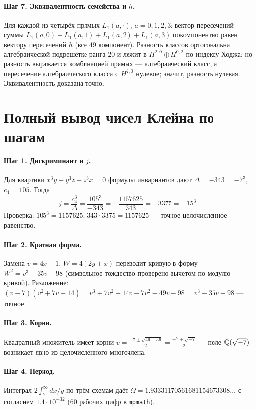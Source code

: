 \paragraph{Шаг 7. Эквивалентность семейства и $h$.} Для каждой из
четырёх прямых $L_1(a,\cdot)$, $a=0,1,2,3$: вектор пересечений
суммы $L_1(a,0)+L_1(a,1)+L_1(a,2)+L_1(a,3)$ покомпонентно равен
вектору пересечений $h$ (все $49$ компонент). Разность классов
ортогональна алгебраической подрешётке ранга $20$ и лежит в
$H^{2,0}\oplus H^{0,2}$ по индексу Ходжа; но разность выражается
комбинацией прямых --- алгебраический класс, а пересечение
алгебраического класса с $H^{2,0}$ нулевое; значит, разность
нулевая. Эквивалентность доказана точно.

\section{Полный вывод чисел Клейна по шагам}\label{sec:workklein}

\paragraph{Шаг 1. Дискриминант и $j$.} Для квартики
$x^3y+y^3z+z^3x=0$ формулы инвариантов дают $\Delta=-343=-7^3$,
$c_4=105$. Тогда
\[
  j=\frac{c_4^3}{\Delta}=\frac{105^3}{-343}
  =-\frac{1157625}{343}=-3375=-15^3.
\]
Проверка: $105^3=1157625$; $343\cdot3375=1157625$ --- точное
целочисленное равенство.

\paragraph{Шаг 2. Кратная форма.} Замена $v=4x-1$, $W=4(2y+x)$
переводит кривую в форму $W^2=v^3-35v-98$ (символьное тождество
проверено вычетом по модулю кривой). Разложение:
$(v-7)(v^2+7v+14)=v^3+7v^2+14v-7v^2-49v-98=v^3-35v-98$ --- точное.

\paragraph{Шаг 3. Корни.} Квадратный множитель имеет корни
$v=\frac{-7\pm\sqrt{49-56}}{2}=\frac{-7\pm\sqrt{-7}}{2}$ ---
поле $\mathbb{Q}(\sqrt{-7})$ возникает явно из целочисленного
многочлена.

\paragraph{Шаг 4. Период.} Интеграл $2\int_7^\infty dx/y$ по трём
схемам даёт $\Omega=1.93331170561681154673308\ldots$ с согласием
$1.4\cdot10^{-32}$ (60 рабочих цифр в \texttt{mpmath}).

